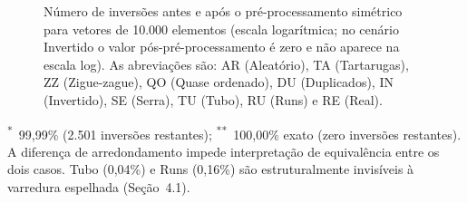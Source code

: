 \documentclass[portuguese]{sbc2025}%
\begin{document}
\begin{figure}[htbp]
\centering
{}

\caption{Número de inversões antes e após o pré-processamento simétrico
para vetores de 10.000 elementos (escala logarítmica; no cenário
Invertido o valor pós-pré-processamento é zero e não aparece na escala log).
As abreviações são: AR (Aleatório), TA (Tartarugas), ZZ (Zigue-zague),
QO (Quase ordenado), DU (Duplicados), IN (Invertido), SE (Serra),
TU (Tubo), RU (Runs) e RE (Real).}
\label{fig:inversoespos}
\end{figure}

\begin{table}[htbp]
\centering
\caption{Redução de inversões proporcionada pelo pré-processamento simétrico em vetores de 10.000 elementos (média dos 50 vetores do \emph{pool} pareado; mesmos vetores cronometrados).}
\label{tab:inversoes}

\end{table}
\textsuperscript{*}~99{,}99\% (2.501 inversões restantes); \textsuperscript{**}~100{,}00\% exato (zero inversões restantes). A diferença de arredondamento impede interpretação de equivalência entre os dois casos. Tubo (0{,}04\%) e Runs (0{,}16\%) são estruturalmente invisíveis à varredura espelhada (Seção~4.1).
\end{document}
